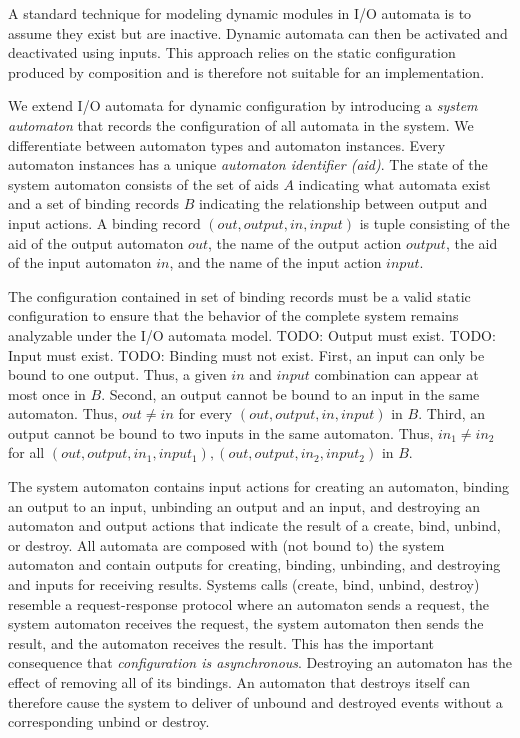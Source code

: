 \documentclass[letterpaper]{article}
\begin{document}
A standard technique for modeling dynamic modules in I/O automata is to assume they exist but are inactive.
Dynamic automata can then be activated and deactivated using inputs.
This approach relies on the static configuration produced by composition and is therefore not suitable for an implementation.

We extend I/O automata for dynamic configuration by introducing a \emph{system automaton} that records the configuration of all automata in the system.
We differentiate between automaton types and automaton instances.
Every automaton instances has a unique \emph{automaton identifier (aid)}.
The state of the system automaton consists of the set of aids $A$ indicating what automata exist and a set of binding records $B$ indicating the relationship between output and input actions.
A binding record $(out, output, in, input)$ is tuple consisting of the aid of the output automaton $out$, the name of the output action $output$, the aid of the input automaton $in$, and the name of the input action $input$.

The configuration contained in set of binding records must be a valid static configuration to ensure that the behavior of the complete system remains analyzable under the I/O automata model.
TODO:  Output must exist.
TODO:  Input must exist.
TODO:  Binding must not exist.
First, an input can only be bound to one output.
Thus, a given $in$ and $input$ combination can appear at most once in $B$.
Second, an output cannot be bound to an input in the same automaton.
Thus, $out \neq in$ for every $(out, output, in, input)$ in $B$.
Third, an output cannot be bound to two inputs in the same automaton.
Thus, $in_1 \neq in_2$ for all $(out, output, in_1, input_1), (out, output, in_2, input_2)$ in $B$.

The system automaton contains input actions for creating an automaton, binding an output to an input, unbinding an output and an input, and destroying an automaton and output actions that indicate the result of a create, bind, unbind, or destroy.
All automata are composed with (not bound to) the system automaton and contain outputs for creating, binding, unbinding, and destroying and inputs for receiving results.
Systems calls (create, bind, unbind, destroy) resemble a request-response protocol where an automaton sends a request, the system automaton receives the request, the system automaton then sends the result, and the automaton receives the result.
This has the important consequence that \emph{configuration is asynchronous}.
Destroying an automaton has the effect of removing all of its bindings.
An automaton that destroys itself can therefore cause the system to deliver of unbound and destroyed events without a corresponding unbind or destroy.
\end{document}
